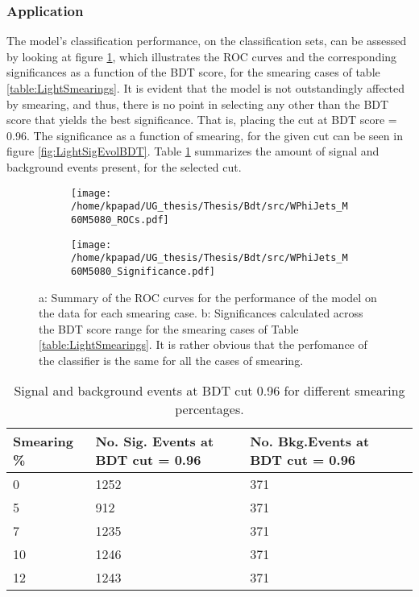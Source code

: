 \subsubsection{Application}
\label{sec:orgebb08bf}
\label{sec:Light_application}
The model's classification performance, on the classification sets, can be assessed by looking at figure \ref{fig:LightROCSIG}, which illustrates the ROC curves and the corresponding significances as a function of the BDT score, for the smearing cases of table \ref{table:LightSmearings}. It is evident that the model is not outstandingly affected by smearing, and thus, there is no point in selecting any other than the BDT score that yields the best significance. That is, placing the cut at BDT score = 0.96. The significance as a function of smearing, for the given cut can be seen in figure \ref{fig:LightSigEvolBDT}. Table \ref{table:LightNumSIGBKG} summarizes the amount of signal and background events present, for the selected cut.
\begin{figure}[h]
\centering
\begin{subfigure}{0.49\textwidth}
\centering
\texttt{[image: /home/kpapad/UG\_thesis/Thesis/Bdt/src/WPhiJets\_M60M5080\_ROCs.pdf]}
\caption{}
\end{subfigure}
\begin{subfigure}{0.49\textwidth}
\centering
\texttt{[image: /home/kpapad/UG\_thesis/Thesis/Bdt/src/WPhiJets\_M60M5080\_Significance.pdf]}
\caption{}
\end{subfigure}
\caption{a: Summary of the ROC curves for the performance of the model on the data for each smearing case. b: Significances calculated across the BDT score range for the smearing cases of Table \ref{table:LightSmearings}. It is rather obvious that the perfomance of the classifier is the same for all the cases of smearing. }
\label{fig:LightROCSIG}
\end{figure}

\begin{table}[ht]
\centering
\begin{tabular}{|p{2cm}|p{3cm}|p{3cm}|}
 \hline
Smearing \%  & No. Sig. Events at BDT cut = 0.96 & No. Bkg.Events at BDT cut = 0.96 \\
\hline
0 & 1252 & 371 \\
5 & 912 & 371 \\
7 & 1235 & 371 \\
10 & 1246 & 371 \\
12 & 1243 & 371 \\
 \hline
\end{tabular}
\caption{Signal and background events at BDT cut 0.96 for different smearing percentages.}
\label{table:LightNumSIGBKG}
\end{table}


